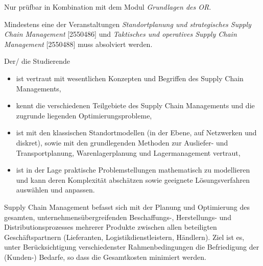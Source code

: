\begin{module}
\begin{styleenv}
\begin{assessment}
\end{assessment}

\begin{conditions}Nur prüfbar in Kombination mit dem Modul \emph{Grundlagen des OR}.

 

Mindestens eine der Veranstaltungen \emph{Standortplanung und strategisches Supply Chain Management} [2550486] und \emph{Taktisches und operatives Supply Chain Management }[2550488] muss absolviert werden.

 \end{conditions}


\end{styleenv}

\begin{learningoutcomes}
Der/ die Studierende

 \begin{itemize}\item ist vertraut mit wesentlichen Konzepten und Begriffen des Supply Chain Managements,  \item kennt die verschiedenen Teilgebiete des Supply Chain Managements und die zugrunde liegenden Optimierungsprobleme,  \item ist mit den klassischen Standortmodellen (in der Ebene, auf Netzwerken und diskret), sowie mit den grundlegenden Methoden zur Ausliefer- und Transportplanung, Warenlagerplanung und Lagermanagement vertraut,  \item ist in der Lage praktische Problemstellungen mathematisch zu modellieren und kann deren Komplexität abschätzen sowie geeignete Lösungsverfahren auswählen und anpassen.  \end{itemize}
\end{learningoutcomes}

\begin{content}
Supply Chain Management befasst sich mit der Planung und Optimierung des gesamten, unternehmensübergreifenden Beschaffungs-, Herstellungs- und Distributionsprozesses mehrerer Produkte zwischen allen beteiligten Geschäftspartnern (Lieferanten, Logistikdienstleistern, Händlern). Ziel ist es, unter Berücksichtigung verschiedenster Rahmenbedingungen die Befriedigung der (Kunden-) Bedarfe, so dass die Gesamtkosten minimiert werden.

 


\end{content}
\end{module}
